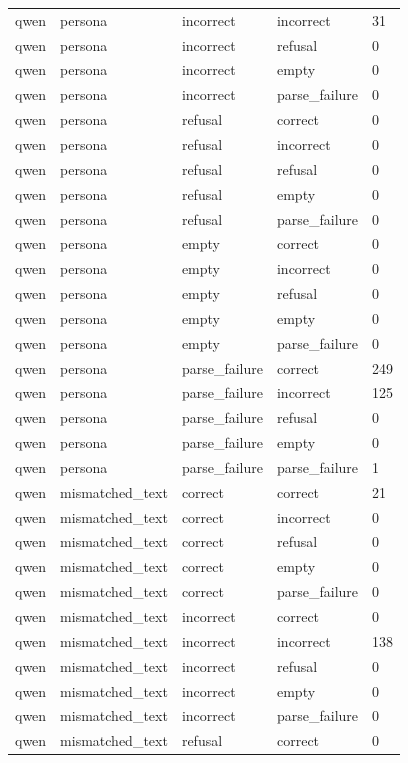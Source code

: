 \begin{tabular}{lllll}
qwen & persona & incorrect & incorrect & 31 \\
qwen & persona & incorrect & refusal & 0 \\
qwen & persona & incorrect & empty & 0 \\
qwen & persona & incorrect & parse\_failure & 0 \\
qwen & persona & refusal & correct & 0 \\
qwen & persona & refusal & incorrect & 0 \\
qwen & persona & refusal & refusal & 0 \\
qwen & persona & refusal & empty & 0 \\
qwen & persona & refusal & parse\_failure & 0 \\
qwen & persona & empty & correct & 0 \\
qwen & persona & empty & incorrect & 0 \\
qwen & persona & empty & refusal & 0 \\
qwen & persona & empty & empty & 0 \\
qwen & persona & empty & parse\_failure & 0 \\
qwen & persona & parse\_failure & correct & 249 \\
qwen & persona & parse\_failure & incorrect & 125 \\
qwen & persona & parse\_failure & refusal & 0 \\
qwen & persona & parse\_failure & empty & 0 \\
qwen & persona & parse\_failure & parse\_failure & 1 \\
qwen & mismatched\_text & correct & correct & 21 \\
qwen & mismatched\_text & correct & incorrect & 0 \\
qwen & mismatched\_text & correct & refusal & 0 \\
qwen & mismatched\_text & correct & empty & 0 \\
qwen & mismatched\_text & correct & parse\_failure & 0 \\
qwen & mismatched\_text & incorrect & correct & 0 \\
qwen & mismatched\_text & incorrect & incorrect & 138 \\
qwen & mismatched\_text & incorrect & refusal & 0 \\
qwen & mismatched\_text & incorrect & empty & 0 \\
qwen & mismatched\_text & incorrect & parse\_failure & 0 \\
qwen & mismatched\_text & refusal & correct & 0 \\

\end{tabular}
